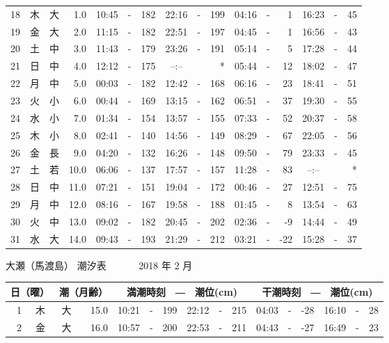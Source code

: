 \documentclass[12pt.a4j]{jsarticle}
\begin{document}
\begin{center}
\begin{table}[ht]
\begin{tabular}{|rc|cr|ccrccr|ccrccr|}
18 & 木 & 大 &  1.0 & 10:45 &-& 182 & 22:16 &-& 199 & 04:16 &-&   1 & 16:23 &-&  45 \\
19 & 金 & 大 &  2.0 & 11:15 &-& 182 & 22:51 &-& 197 & 04:45 &-&   1 & 16:56 &-&  43 \\
20 & 土 & 中 &  3.0 & 11:43 &-& 179 & 23:26 &-& 191 & 05:14 &-&   5 & 17:28 &-&  44 \\
21 & 日 & 中 &  4.0 & 12:12 &-& 175 & --:-- & &  *  & 05:44 &-&  12 & 18:02 &-&  47 \\
22 & 月 & 中 &  5.0 & 00:03 &-& 182 & 12:42 &-& 168 & 06:16 &-&  23 & 18:41 &-&  51 \\
23 & 火 & 小 &  6.0 & 00:44 &-& 169 & 13:15 &-& 162 & 06:51 &-&  37 & 19:30 &-&  55 \\
24 & 水 & 小 &  7.0 & 01:34 &-& 154 & 13:57 &-& 155 & 07:33 &-&  52 & 20:37 &-&  58 \\
25 & 木 & 小 &  8.0 & 02:41 &-& 140 & 14:56 &-& 149 & 08:29 &-&  67 & 22:05 &-&  56 \\
26 & 金 & 長 &  9.0 & 04:20 &-& 132 & 16:26 &-& 148 & 09:50 &-&  79 & 23:33 &-&  45 \\
27 & 土 & 若 & 10.0 & 06:06 &-& 137 & 17:57 &-& 157 & 11:28 &-&  83 & --:-- & &  *  \\
28 & 日 & 中 & 11.0 & 07:21 &-& 151 & 19:04 &-& 172 & 00:46 &-&  27 & 12:51 &-&  75 \\
29 & 月 & 中 & 12.0 & 08:16 &-& 167 & 19:58 &-& 188 & 01:45 &-&   8 & 13:54 &-&  63 \\
30 & 火 & 中 & 13.0 & 09:02 &-& 182 & 20:45 &-& 202 & 02:36 &-&  -9 & 14:44 &-&  49 \\
31 & 水 & 大 & 14.0 & 09:43 &-& 193 & 21:29 &-& 212 & 03:21 &-& -22 & 15:28 &-&  37 \\
\hline
\end{tabular}
\end{table}
\newpage
{\LARGE 大瀬（馬渡島）  潮汐表　　　}
{\large 2018 年  2 月}\\
\begin{table}[ht]
\begin{tabular}{|rc|cr|ccrccr|ccrccr|}
\hline
\multicolumn{2}{|c|}{日（曜）} & \multicolumn{2}{c|}{潮（月齢）} & \multicolumn{6}{c|}{満潮時刻　―　潮位(cm)} & \multicolumn{6}{c|}{干潮時刻　―　潮位(cm)} \\
\hline
 1 & 木 & 大 & 15.0 & 10:21 &-& 199 & 22:12 &-& 215 & 04:03 &-& -28 & 16:10 &-&  28 \\
 2 & 金 & 大 & 16.0 & 10:57 &-& 200 & 22:53 &-& 211 & 04:43 &-& -27 & 16:49 &-&  23 \\

\end{tabular}
\end{table}
\end{center}
\end{document}
